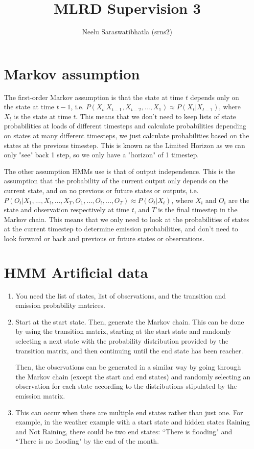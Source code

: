 \documentclass[12pt]{article}
\author{Neelu Saraswatibhatla (srns2)}
\title{MLRD Supervision 3}
\date{\vspace{-5ex}}
\begin{document}
\maketitle

\section*{Markov assumption}

The first-order Markov assumption is that the state at time $t$ depends only on the state at time $t-1$, i.e. $P(X_t | X_{t-1}, X_{t-2}, \ldots, X_1) \approx P(X_t | X_{t-1})$, where $X_t$ is the state at time $t$.
This means that we don't need to keep lists of state probabilities at loads of different timesteps and calculate probabilities depending on states at many different timesteps, we just calculate probabilities based on the states at the previous timestep.
This is known as the Limited Horizon as we can only "see" back 1 step, so we only have a "horizon" of 1 timestep.

The other assumption HMMs use is that of output independence. This is the assumption that the probability of the current output only depends on the current state, and on no previous or future states or outputs, i.e. $P(O_t | X_1, \ldots, X_t, \ldots, X_T, O_1, \ldots, O_t, \ldots, O_T) \approx P(O_t | X_t)$, where $X_t$ and $O_t$ are the state and observation respectively at time $t$, and $T$ is the final timestep in the Markov chain.
This means that we only need to look at the probabilities of states at the current timestep to determine emission probabilities, and don't need to look forward or back and previous or future states or observations.

\section*{HMM Artificial data}
\begin{enumerate}
    \item You need the list of states, list of observations, and the transition and emission probability matrices.
    \item Start at the start state. Then, generate the Markov chain. This can be done by using the transition matrix, starting at the start state and randomly selecting a next state with the probability distribution provided by the transition matrix, and then continuing until the end state has been reacher.

    Then, the observations can be generated in a similar way by going through the Markov chain (except the start and end states) and randomly selecting an observation for each state according to the distributions stipulated by the emission matrix.
    
    \item This can occur when there are multiple end states rather than just one. For example, in the weather example with a start state and hidden states Raining and Not Raining, there could be two end states: ``There is flooding" and ``There is no flooding" by the end of the month.
\end{enumerate}
\end{document}

